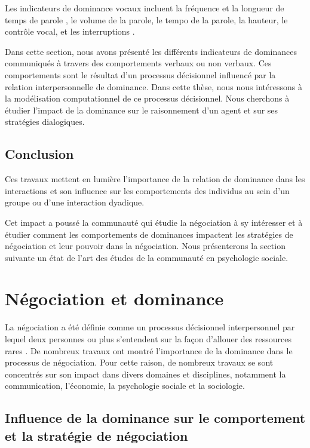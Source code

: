 			Les indicateurs de dominance vocaux incluent la fréquence et la longueur de temps de parole \cite{mast2002dominance}, le volume de la parole, le tempo de la parole, la hauteur, le contrôle vocal, et les interruptions \cite{dunbar2005perceptions}.
		
		Dans cette section, nous avons présenté les différents indicateurs de dominances communiqués à travers des comportements verbaux ou non verbaux. Ces comportements sont le résultat d'un processus décisionnel influencé par la relation interpersonnelle de dominance. Dans cette thèse, nous nous intéressons à la modélisation computationnel de ce processus décisionnel. Nous cherchons à étudier l'impact de la dominance sur le raisonnement d'un agent et sur ses stratégies dialogiques. 
		
		\subsection{Conclusion}
			
			Ces travaux mettent en lumière l'importance de la relation de dominance dans les interactions et son influence sur les comportements des individus au sein d'un groupe ou d'une interaction dyadique.
			
			Cet impact a poussé la communauté qui étudie la négociation à sy intéresser et à étudier comment les comportements de dominances impactent les stratégies de négociation et leur pouvoir dans la négociation. 
			Nous présenterons la section suivante un état de l'art des études de la communauté en psychologie sociale.
			
			
	\section{Négociation et dominance}
	\label{sec:domNego}
	La négociation a été définie comme un processus décisionnel interpersonnel par lequel deux personnes ou plus s'entendent sur la façon d'allouer des ressources rares \cite{thompson2000mind}. De nombreux travaux \cite{de1995impact,van2006power,fiske1993controlling} ont montré l'importance de la dominance dans le processus de négociation. Pour cette raison, de nombreux travaux se sont concentrés sur son impact dans divers domaines et disciplines, notamment la communication, l'économie, la psychologie sociale et la sociologie.
	

	
	\subsection{Influence de la dominance sur le comportement et la stratégie de négociation}
	
